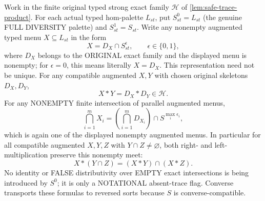 \begin{lemma}
\label{lem:augmented-safe-skeleton-calculus}
Work in the finite original
typed strong exact family
$\mathcal H$ of
\cref{lem:safe-trace-product}.
For each actual typed
hom-palette $L_{st}$,
put $S^0_{st}=L_{st}$
(the genuine FULL
DIVERSITY palette)
and $S^1_{st}=S_{st}$.
Write any nonempty
augmented typed menu
$X\subseteq L_{st}$ in
the form
\[
        X=D_X\cap S^\epsilon_{st},
 \qquad
 \epsilon\in\{0,1\},
\]
where $D_X$ belongs to the
ORIGINAL exact family and
the displayed menu is
nonempty; for $\epsilon=0$,
this means literally $X=D_X$.
This representation need
not be unique. For any
compatible augmented
$X,Y$ with chosen original
skeletons $D_X,D_Y$,
\[
                       X*Y=D_X*D_Y
                  \in\mathcal H.
\tag{AS1}\label{eq:augmented-skeleton-product}
\]
For any NONEMPTY finite
intersection of parallel
augmented menus,
\[
  \bigcap_{i=1}^m X_i
   =\left(\bigcap_{i=1}^m D_{X_i}\right)
             \cap S^{\max_i\epsilon_i},
\tag{AS2}\label{eq:augmented-skeleton-meet}
\]
which is again one of
the displayed nonempty
augmented menus. In
particular for all
compatible augmented
$X,Y,Z$ with
$Y\cap Z\ne\varnothing$,
both right- and left-
multiplication preserve
this nonempty meet:
\[
       X*(Y\cap Z)
          =(X*Y)\cap(X*Z).
\tag{AS3}\label{eq:augmented-skeleton-distrib}
\]
No identity or FALSE
distributivity over EMPTY
exact intersections is
being introduced by
$S^0$; it is only a
NOTATIONAL absent-trace
flag. Converse transports
these formulas to reversed
sorts because $S$ is
converse-compatible.
\end{lemma}
